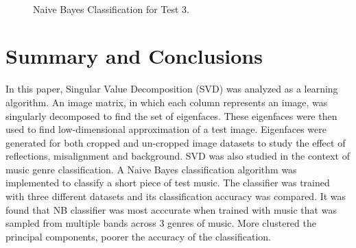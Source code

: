 \documentclass{article}
\begin{document}
\begin{figure}[!b]
\\
\caption{Naive Bayes Classification for Test 3.}
\label{fig:classification}
\end{figure}


\pagebreak
\section{Summary and Conclusions}
In this paper, Singular Value Decomposition (SVD) was analyzed as a learning algorithm. An image matrix, in which each column represents an image, was singularly decomposed to find the set of eigenfaces. These eigenfaces were then used to find low-dimensional approximation of a test image. Eigenfaces were generated for both cropped and un-cropped image datasets to study the effect of reflections, misalignment and background. SVD was also studied in the context of music genre classification. A Naive Bayes classification algorithm was implemented to classify a short piece of test music. The classifier was trained with three different datasets and its classification accuracy was compared. It was found that NB classifier was most acccurate when trained with music that was sampled from multiple bands across $3$ genres of music. More clustered the principal components, poorer the accuracy of the classification.
\end{document}
